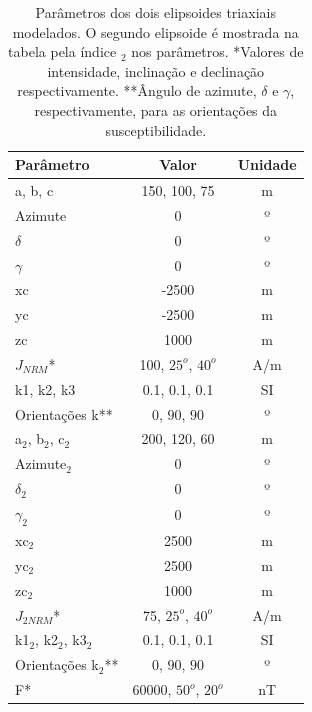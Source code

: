 \begin{table}[h!]
	\begin{center}
		\begin{tabular}{|l|c|c|}
			\hline
			\textbf{Parâmetro}  & \textbf{Valor}  & \textbf{Unidade}\\
			\hline 
			a, b, c   & 150, 100, 75 & m\\
			\hline
			Azimute   & $0$ & º\\
			\hline
			$\delta$    & $0$ & º\\
			\hline
			$\gamma$   & $0$  & º\\
			\hline
			xc   & -2500  & m\\
			\hline          
			yc   & -2500  & m\\
			\hline                
			zc   & 1000  & m\\
			\hline
			$J_{NRM}$*  & 100, $25^o$, $40^o$  & A/m\\
			\hline
			k1, k2, k3   & 0.1, 0.1, 0.1  & SI\\
			\hline
			Orientações k**   & $0$, $90$, $90$  & º\\
			\hline 
			a$_2$, b$_2$, c$_2$   & 200, 120, 60 & m\\
			\hline
			Azimute$_2$   & $0$ & º\\
			\hline
			$\delta_2$    & $0$ & º\\
			\hline
			$\gamma_2$   & $0$  & º\\
			\hline
			xc$_2$   & 2500  & m\\
			\hline          
			yc$_2$   & 2500  & m\\
			\hline                
			zc$_2$   & 1000  & m\\
			\hline
			$J_{2NRM}$*  & 75, $25^o$, $40^o$  & A/m\\
			\hline
			k1$_2$, k2$_2$, k3$_2$   & 0.1, 0.1, 0.1  & SI\\
			\hline
			Orientações k$_2$**   & $0$, $90$, $90$  & º\\
			\hline
			F*    & 60000, $50^o$, $20^o$ & nT\\
			\hline			
		\end{tabular}
		\caption{Parâmetros dos dois elipsoides triaxiais modelados. O segundo elipsoide é mostrada na tabela pela índice $_2$ nos parâmetros. *Valores de intensidade, inclinação e declinação respectivamente. **Ângulo de azimute, $\delta$ e $\gamma$, respectivamente, para as orientações da susceptibilidade.}
	\end{center}
	\label{tab:ellipsoid_triaxial_multi}
\end{table}

